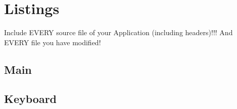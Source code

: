 \documentclass[12pt,a4paper,titlepage,oneside]{article}
\begin{document}
\section{Listings}
\small{

Include EVERY source file of your Application (including headers)!!!
And EVERY file you have modified!


\subsection{Main}








\subsection{Keyboard}







}
\end{document}
